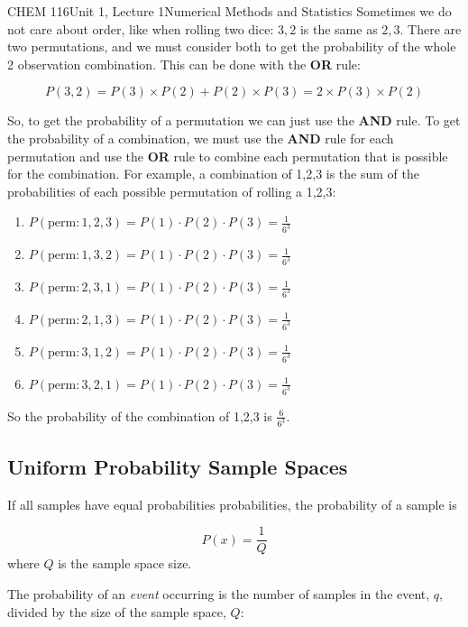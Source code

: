 \documentclass{article}
\begin{document}
\begin{tdoc}{CHEM 116}{Unit 1, Lecture 1}{Numerical Methods and Statistics}
Sometimes we do not care about order, like when rolling two dice:
$3,2$ is the same as $2,3$. There are two permutations, and we must
consider both to get the probability of the whole 2 observation
combination. This can be done with the {\bf OR} rule:

\begin{equation}
P(3,2) = P(3)\times P(2) + P(2) \times P(3) = 2\times P(3)\times P(2)
\end{equation}

So, to get the probability of a permutation we can just use the {\bf
  AND} rule. To get the probability of a combination, we must use the
{\bf AND} rule for each permutation and use the {\bf OR} rule to
combine each permutation that is possible for the combination. For
example, a combination of 1,2,3 is the sum of the probabilities of
each possible permutation of rolling a 1,2,3:
\begin{enumerate}
\item $P(\textrm{perm}: 1,2,3) = P(1)\cdot P(2) \cdot P(3) = \frac{1}{6^3}$
\item $P(\textrm{perm}: 1,3,2) = P(1)\cdot P(2) \cdot P(3) = \frac{1}{6^3}$  
\item $P(\textrm{perm}: 2,3,1) = P(1)\cdot P(2) \cdot P(3) = \frac{1}{6^3}$
\item $P(\textrm{perm}: 2,1,3) = P(1)\cdot P(2) \cdot P(3) = \frac{1}{6^3}$
\item $P(\textrm{perm}: 3,1,2) = P(1)\cdot P(2) \cdot P(3) = \frac{1}{6^3}$
\item $P(\textrm{perm}: 3,2,1) = P(1)\cdot P(2) \cdot P(3) = \frac{1}{6^3}$
\end{enumerate}
So the probability of the combination of 1,2,3 is
$\frac{6}{6^3}$. 

\subsection{Uniform Probability Sample Spaces} 

If all samples have equal probabilities probabilities, the probability of a
sample is

\begin{equation}
P(x) = \frac{1}{Q}
\end{equation}
where $Q$ is the sample space size.
\vspace{0.2cm}


The probability of an \emph{event} occurring is the number of samples
in the event, $q$, divided by the size of the sample space, $Q$:


\end{tdoc}
\end{document}
